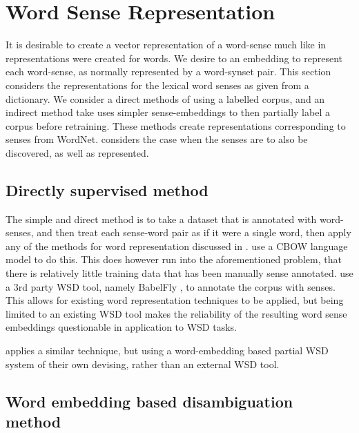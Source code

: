 \documentclass[12pt,parskip]{komatufte}
\begin{document}
\section{Word Sense Representation}
It is desirable to create a vector representation of a word-sense much like in  representations were created for words.
We desire to an embedding to represent each word-sense, as normally represented by a word-synset pair.
This section considers the representations for the lexical word senses as given from a dictionary.
We consider a direct methods of using a labelled corpus, and an indirect method take uses simpler sense-embeddings to then partially label a corpus before retraining.
These methods create representations corresponding to senses from WordNet.
 considers the case when the senses are to also be discovered, as well as represented.




\subsection{Directly supervised method}
The simple and direct method is to take a dataset that is annotated with word-senses,
and then treat each sense-word pair as if it were a single word, then apply any of the methods for word representation discussed in .
 use a CBOW language model \parencite{mikolov2013efficient} to do this.
This does however run into the aforementioned problem, that there is relatively little training data that has been manually sense annotated.
\textcite{iacobacci2015sensembed} use a 3rd party WSD tool, namely BabelFly \parencite{Moro2014}, to annotate the corpus with senses.
This allows for existing word representation techniques to be applied, but being limited to an existing WSD tool makes the reliability of the resulting word sense embeddings questionable in application to WSD tasks.

 applies a similar technique, but using a word-embedding based partial WSD system of their own devising, rather than an external WSD tool.


\subsection{Word embedding based disambiguation method}\label{sec:pseudo-semi-supervised-method}
\end{document}
